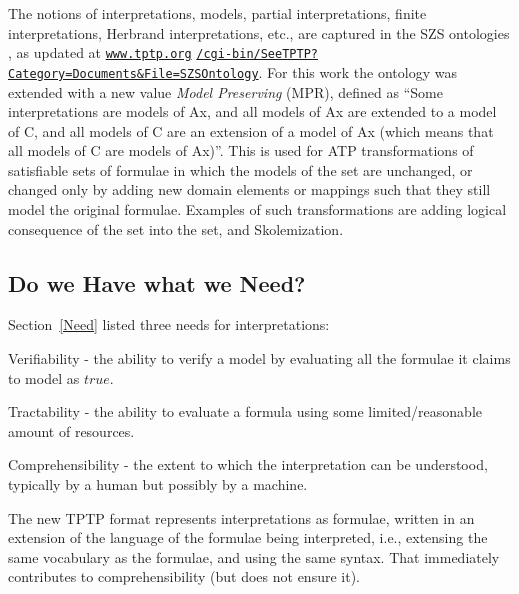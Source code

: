 \documentclass{easychair}
\newenvironment{packed_itemize}{
\vspace*{-0.2em}
\begin{itemize}
\setlength{\partopsep}{0pt}
\setlength{\itemsep}{1pt}
\setlength{\parskip}{0pt}
\setlength{\parsep}{0pt}
}{\end{itemize}}
\begin{document}
The notions of interpretations, models, partial interpretations, finite interpretations,
Herbrand interpretations, etc., are captured in the SZS ontologies \cite{Sut08-KEAPPA}, as
updated at 
\href{https://www.tptp.org/cgi-bin/SeeTPTP?Category=Documents\&File=SZSOntology}{\tt www.tptp.org}
\href{https://www.tptp.org/cgi-bin/SeeTPTP?Category=Documents\&File=SZSOntology}{\tt /cgi-bin/SeeTPTP?Category=Documents\&File=SZSOntology}.
For this work the ontology was extended with a new value {\em Model Preserving} (MPR), defined
as ``Some interpretations are models of Ax, and
  all models of Ax are extended to a model of C, and
  all models of C are an extension of a model of Ax
  (which means that all models of C are models of Ax)''.
This is used for ATP transformations of satisfiable sets of formulae in which the models
of the set are unchanged, or changed only by adding new domain elements or mappings such
that they still model the original formulae.
Examples of such transformations are adding logical consequence of the set into the set, and
Skolemization.

\subsection{Do we Have what we Need?}
\label{HaveNeed}

Section~\ref{Need} listed three needs for interpretations: 
\begin{packed_itemize}
\item Verifiability - the ability to verify a model by evaluating all the formulae it claims
      to model as $true$.
\item Tractability - the ability to evaluate a formula using some limited/reasonable amount of
      resources.
\item Comprehensibility - the extent to which the interpretation can be understood, typically
      by a human but possibly by a machine.
\end{packed_itemize}

The new TPTP format represents interpretations as formulae, written in an extension of the
language of the formulae being interpreted, i.e., extensing the same vocabulary as the formulae, 
and using the same syntax.
That immediately contributes to comprehensibility (but does not ensure it).
\end{document}
